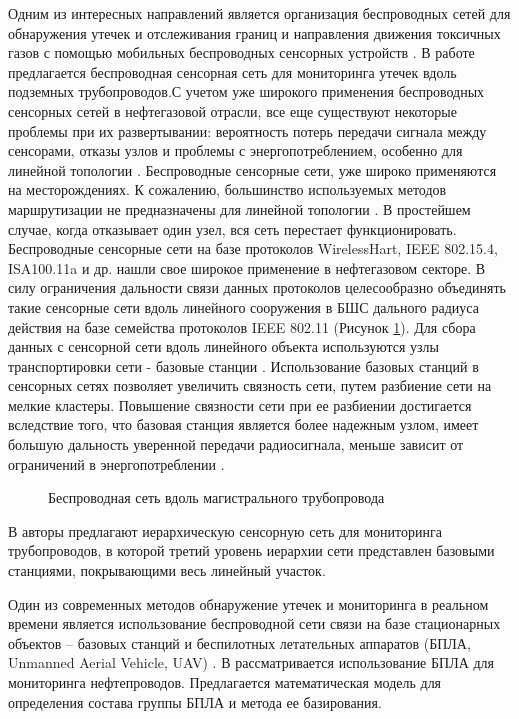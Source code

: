 Одним из интересных направлений является организация беспроводных сетей для обнаружения утечек и отслеживания границ и направления движения токсичных газов с помощью мобильных беспроводных сенсорных устройств \cite{Krzyszton2021}. В работе \cite{Lin2019} предлагается беспроводная сенсорная сеть для мониторинга утечек вдоль подземных трубопроводов.С учетом уже широкого применения беспроводных сенсорных сетей в нефтегазовой отрасли, все еще существуют некоторые
проблемы при их развертывании: вероятность потерь передачи сигнала между сенсорами, отказы узлов и проблемы с энергопотреблением, особенно для линейной топологии \cite{Lee2020}. Беспроводные сенсорные сети, уже широко применяются на месторождениях. К сожалению, большинство используемых методов маршрутизации не предназначены для линейной топологии \cite{Abbas2018}. В простейшем случае, когда отказывает один узел, вся сеть перестает функционировать. Беспроводные сенсорные сети на базе протоколов WirelessHart, IEEE 802.15.4, ISA100.11a и др. нашли свое широкое применение в нефтегазовом секторе. В силу ограничения дальности связи данных протоколов целесообразно объединять такие сенсорные сети вдоль линейного сооружения в БШС дального радиуса действия на базе семейства протоколов IEEE 802.11 (Рисунок \ref{fig:part2_pipeline}). Для сбора данных с сенсорной сети вдоль линейного объекта используются узлы транспортировки сети -  базовые станции \cite{Fataliyev2018}.  Использование базовых станций в сенсорных сетях позволяет увеличить связность сети, путем разбиение сети на мелкие кластеры. Повышение связности сети при ее разбиении достигается вследствие того, что базовая станция является более надежным узлом, имеет большую дальность уверенной передачи радиосигнала, меньше зависит от ограничений в энергопотреблении \cite{Krasnov2016}.

\begin{figure}[ht]
  \caption{Беспроводная сеть вдоль магистрального трубопровода}\label{fig:part2_pipeline}
\end{figure}

В \cite{Anupama2014, Jawhar2007} авторы предлагают иерархическую сенсорную сеть для мониторинга трубопроводов, в которой третий уровень иерархии сети представлен базовыми станциями, покрывающими весь линейный участок.

Один из современных методов обнаружение утечек и мониторинга в реальном времени является использование беспроводной сети связи на базе стационарных объектов -- базовых станций и  беспилотных летательных аппаратов  (БПЛА, Unmanned Aerial Vehicle, UAV) \cite{Aljuaid2020}. В \cite{Fedorova2020} рассматривается использование БПЛА для мониторинга нефтепроводов. Предлагается математическая модель для определения состава группы БПЛА и метода ее базирования.

